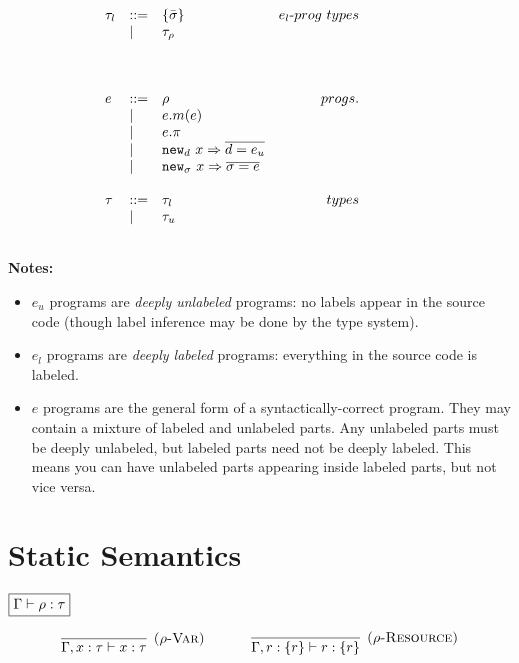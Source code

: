\documentclass{llncs}
\newcommand{\keywadj}[1]{\mathtt{#1}}
\newcommand{\kwa}[1]{\keywadj{ #1 }}
\newcommand{\hyphen}{\hbox{-}}
\begin{document}
\[\begin{array}{lll}
\begin{array}{lllr}
\tau_l & ::= & \{ \bar \sigma \} & e_l \hyphen prog~types \\
	& | & \tau_\rho \\
	&&\\\\\\
	
	
	
	
	
	
	
	
	
e & ::= & \rho & progs. \\
	& | & e.m(e) \\
	& | & e.\pi \\
	& | & \kwa{new}_d~x \Rightarrow \overline{d = e_u} \\
	& | & \kwa{new}_\sigma~x \Rightarrow \overline{\sigma = e} \\
	&&\\
	
\tau & ::= & \tau_l & types \\
	& | & \tau_u \\
	&&\\
		
		
\end{array}
& ~~~~~~
&
\end{array}
\]

\noindent \textbf{Notes:}

\begin{itemize}
	\item $e_u$ programs are \textit{deeply unlabeled} programs: no labels appear in the source code (though label inference may be done by the type system).
	\item $e_l$ programs are \textit{deeply labeled} programs: everything in the source code is labeled.
	\item $e$ programs are the general form of a syntactically-correct program. They may contain a mixture of labeled and unlabeled parts. Any unlabeled parts must be deeply unlabeled, but labeled parts need not be deeply labeled. This means you can have unlabeled parts appearing inside labeled parts, but not vice versa.
\end{itemize}


\section{Static Semantics}

\noindent
$\fbox{$\Gamma \vdash \rho : \tau$}$

\[
\begin{array}{c}

\infer[\textsc{($\rho$-Var)}]
	{\Gamma, x : \tau \vdash x : \tau}
	{}
~~~~~~~~~~
\infer[\textsc{($\rho$-Resource)}]
	{\Gamma, r : \{ r \} \vdash r : \{ r \}}
	{} \\[6ex]

\end{array}
\]
\end{document}
